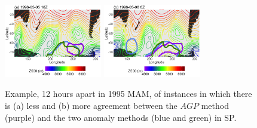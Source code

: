 \documentclass[smallextended]{svjour3}       %
\numberwithin{equation}{section}
\begin{document}
\begin{figure}
\centering
\includegraphics[width=0.38\textwidth]{fig7a}
\includegraphics[width=0.38\textwidth]{fig7b}
\caption{Example, 12 hours apart in 1995 MAM, of instances in which there is (a) less and (b) more agreement between the $AGP$ method (purple) and the two anomaly methods (blue and green) in SP.}\label{zgdiff}
\end{figure}
\end{document}
